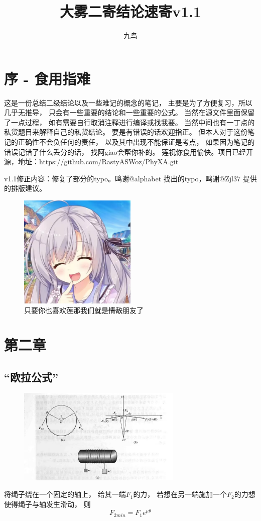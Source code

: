 \documentclass{ctexart}
\author{九鸟}
\title{大雾二寄结论速寄v1.1}
\date{}
\begin{document}
\maketitle
\section{序 - 食用指难}
这是一份总结二级结论以及一些难记的概念的笔记，
主要是为了方便复习，所以几乎无推导，
只会有一些重要的结论和一些重要的公式。
当然在源文件里面保留了一点过程，
如有需要自行取消注释进行编译或找我要。
当然中间也有一丁点的私货题目来解释自己的私货结论。
要是有错误的话欢迎指正。
但本人对于这份笔记的正确性不会负任何的责任，
以及其中出现不能保证是考点，
如果因为笔记的错误记错了什么丢分的话，
找阿giao会帮你补的。
莲祝你食用愉快。项目已经开源，地址：https://github.com/RastyASWoz/PhyXA.git


v1.1修正内容：修复了部分的typo。鸣谢@alphabet 找出的typo，鸣谢@Zjl37 提供的排版建议。
\begin{figure}[H]
    \centering
    \includegraphics[width=0.5\textwidth]{img/lian.jpg}
    \caption[ ]{只要你也喜欢莲那我们就是\sout{情敌}朋友了}
\end{figure}
\section{第二章}
\subsection{“欧拉公式”}
\begin{figure}[H]
    \centering
    \includegraphics[width=0.7\textwidth]{img/ola.jpg}
\end{figure}
将绳子绕在一个固定的轴上，
给其一端$F_1$的力，
若想在另一端施加一个$F_2$的力想使得绳子与轴发生滑动，
则
$$
    F_{2min} = F_1 e^{\mu \theta}
$$
\end{document}
